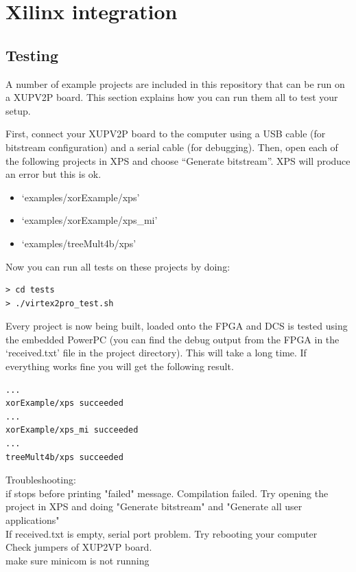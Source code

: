\documentclass[a4paper,oneside]{memoir}
\begin{document}
\clearpage
\chapter{Xilinx integration}\label{sec:xilinx_flow}
\section{Testing}
A number of example projects are included in this repository that can be run on a XUPV2P board. This section explains how you can run them all to test your setup.

First, connect your XUPV2P board to the computer using a USB cable (for bitstream configuration) and a serial cable (for debugging).
Then, open each of the following projects in XPS and choose ``Generate bitstream''. XPS will produce an error but this is ok.
\begin{itemize}
\item `examples/xorExample/xps'
\item `examples/xorExample/xps\_mi'
\item `examples/treeMult4b/xps'
\end{itemize}
Now you can run all tests on these projects by doing:
\begin{lstlisting}
> cd tests
> ./virtex2pro_test.sh
\end{lstlisting}

Every project is now being built, loaded onto the FPGA and DCS is tested using the embedded PowerPC (you can find the debug output from the FPGA in the `received.txt' file in the project directory). This will take a long time. If everything works fine you will get the following result.
\begin{lstlisting}
...
xorExample/xps succeeded
...
xorExample/xps_mi succeeded
...
treeMult4b/xps succeeded
\end{lstlisting}

Troubleshooting:\\
if stops before printing "failed" message. Compilation failed. Try opening the project in XPS and doing "Generate bitstream" and "Generate all user applications"\\
If received.txt is empty, serial port problem. Try rebooting your computer\\
Check jumpers of XUP2VP board.\\
make sure minicom is not running
\end{document}
